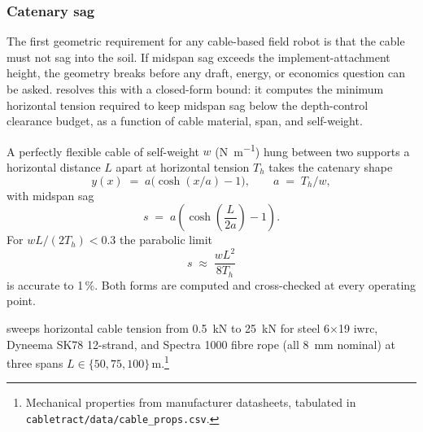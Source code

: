 \documentclass[11pt,a4paper]{article}
\begin{document}
\subsubsection{Catenary sag}\label{sec:catenary}

The first geometric requirement for any cable-based field robot is that the cable must not sag into the soil. If midspan sag exceeds the implement-attachment height, the geometry breaks before any draft, energy, or economics question can be asked.  resolves this with a closed-form bound: it computes the minimum horizontal tension required to keep midspan sag below the depth-control clearance budget, as a function of cable material, span, and self-weight.

A perfectly flexible cable of self-weight $w$ (\si{\newton\per\meter}) hung between two supports a horizontal distance $L$ apart at horizontal tension $T_h$ takes the catenary shape~\cite{irvine1981cables}
\begin{equation}\label{eq:catenary}
y(x) \;=\; a\bigl(\cosh(x/a)-1\bigr), \qquad a \;=\; T_h / w,
\end{equation}
with midspan sag
\begin{equation}\label{eq:sag-exact}
s \;=\; a\!\left(\cosh\!\left(\frac{L}{2a}\right) - 1\right).
\end{equation}
For $w L / (2 T_h) < 0.3$ the parabolic limit
\begin{equation}\label{eq:sag-parabolic}
s \;\approx\; \frac{w L^{2}}{8 T_h}
\end{equation}
is accurate to 1\,\%. Both forms are computed and cross-checked at every operating point.

 sweeps horizontal cable tension from \SI{0.5}{\kilo\newton} to \SI{25}{\kilo\newton} for steel 6$\times$19 \gls{iwrc}, Dyneema SK78 12-strand, and Spectra 1000 fibre rope (all \SI{8}{\milli\meter} nominal) at three spans $L \in \{50, 75, 100\}\,\si{\meter}$.\footnote{Mechanical properties from manufacturer datasheets, tabulated in \texttt{cabletract/data/cable\_props.csv}.}
\end{document}
